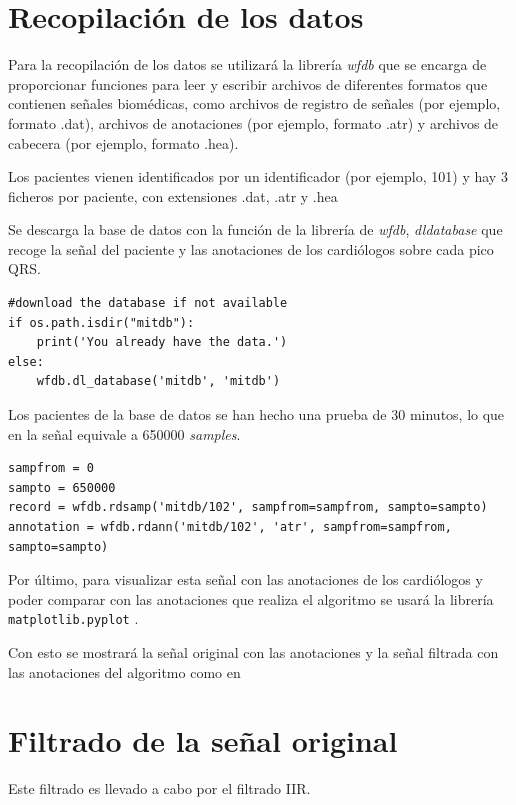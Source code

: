 \section{Recopilación de los datos}
Para la recopilación de los datos se utilizará la librería \textit{wfdb} \cite{WFDB} que se encarga de proporcionar
funciones para leer y escribir archivos de diferentes formatos que contienen señales biomédicas,
como archivos de registro de señales (por ejemplo, formato .dat), archivos de anotaciones
(por ejemplo, formato .atr) y archivos de cabecera (por ejemplo, formato .hea).

Los pacientes vienen identificados por un identificador (por ejemplo, 101) y hay 3 ficheros por paciente, 
con extensiones .dat, .atr y .hea

Se descarga la base de datos con la función de la librería de \textit{wfdb}, \textit{dldatabase} que recoge 
la señal del paciente y las anotaciones de los cardiólogos sobre cada pico QRS.


\lstset{language=python, breaklines=true, basicstyle=\footnotesize}
\begin{lstlisting}[frame=single]
#download the database if not available
if os.path.isdir("mitdb"):
	print('You already have the data.')
else:
	wfdb.dl_database('mitdb', 'mitdb')
\end{lstlisting}

Los pacientes de la base de datos se han hecho una prueba de 30 minutos, lo que en la señal 
equivale a 650000 \textit{samples}.

\lstset{language=python, breaklines=true, basicstyle=\footnotesize}
\begin{lstlisting}[frame=single]
sampfrom = 0
sampto = 650000
record = wfdb.rdsamp('mitdb/102', sampfrom=sampfrom, sampto=sampto)
annotation = wfdb.rdann('mitdb/102', 'atr', sampfrom=sampfrom, sampto=sampto)
\end{lstlisting}

Por último, para visualizar esta señal con las anotaciones de los cardiólogos y poder comparar 
con las anotaciones que realiza el algoritmo se usará la librería \lstinline{matplotlib.pyplot} \cite{Matplotlib}.

Con esto se mostrará la señal original con las anotaciones y la señal filtrada con las anotaciones
del algoritmo como en 

\section{Filtrado de la señal original}
Este filtrado es llevado a cabo por el filtrado IIR.

